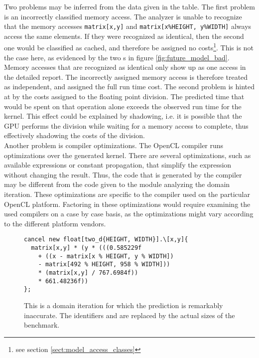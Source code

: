 Two problems may be inferred from the data given in the table. The first problem is an incorrectly classified memory access. The analyzer is unable to recognize that the memory accesses \verb!matrix[x,y]! and \verb!matrix[x%HEIGHT, y%WIDTH]! always access the same elements. If they were recognized as identical, then the second one would be classified as cached, and therefore be assigned no costs\footnote{see section \ref{sect:model_access_classes}}. This is not the case here, as evidenced by the two s in figure \ref{fig:future_model_bad}. Memory accesses that are recognized as identical only show up as one access in the detailed report. The incorrectly assigned memory access is therefore treated as independent, and assigned the full run time cost. The second problem is hinted at by the costs assigned to the floating point division. The predicted time  that would be spent on that operation alone exceeds the observed run time for the kernel. This effect could be explained by shadowing, i.e. it is possible that the GPU performs the division while waiting for a memory access to complete, thus effectively shadowing the costs of the division. \\

Another problem is compiler optimizations. The OpenCL compiler runs optimizations over the generated kernel. There are several optimizations, such as available expressions or constant propagation, that simplify the expression without changing the result. Thus, the code that is generated by the compiler may be different from the code given to the module analyzing the domain iteration. These optimizations are specific to the compiler used on the particular OpenCL platform. Factoring in these optimizations would require examining the used compilers on a case by case basis, as the optimizations might vary according to the different platform vendors.

\begin{figure}
	\lstset{language=java}
	\begin{lstlisting}
cancel new float[two_d{HEIGHT, WIDTH}].\[x,y]{
  matrix[x,y] * (y * (((0.585229f 
  	+ ((x - matrix[x % HEIGHT, y % WIDTH]) 
    - matrix[492 % HEIGHT, 958 % WIDTH])) 
    * (matrix[x,y] / 767.6984f)) 
    * 661.48236f))
};
	\end{lstlisting}
	\caption{This is a domain iteration for which the prediction is remarkably inaccurate. The identifiers  and  are replaced by the actual sizes of the benchmark.}
	\label{fig:future_model_bad_kernel}
\end{figure}

